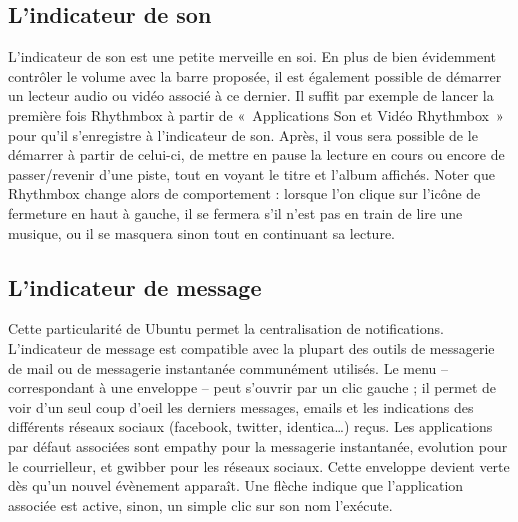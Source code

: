 \subsection{L'indicateur de son}
L'indicateur de son est une petite merveille en soi. En plus de bien évidemment contrôler le volume avec la barre proposée, il est également possible de démarrer un lecteur audio ou vidéo associé à ce dernier. Il suffit par exemple de lancer la première fois Rhythmbox à partir de «~Applications \FlecheDroite Son et Vidéo \FlecheDroite Rhythmbox~» pour qu'il s'enregistre à l'indicateur de son. Après, il vous sera possible de le démarrer à partir de celui-ci, de mettre en pause la lecture en cours ou encore de passer/revenir d'une piste, tout en voyant le titre et l'album affichés. Noter que Rhythmbox change alors de comportement : lorsque l'on clique sur l'icône de fermeture en haut à gauche, il se fermera s'il n'est pas en train de lire une musique, ou il se masquera sinon tout en continuant sa lecture.
\subsection{L'indicateur de message}
Cette particularité de Ubuntu permet la centralisation de notifications. L'indicateur de message est compatible avec la plupart des outils de messagerie de mail ou de messagerie instantanée communément utilisés. Le menu -- correspondant à une enveloppe -- peut s'ouvrir par un clic gauche ; il permet de voir d'un seul coup d'oeil les derniers messages, emails et les indications des différents réseaux sociaux (facebook, twitter, identica\dots{}) reçus. Les applications par défaut associées sont empathy pour la messagerie instantanée, evolution pour le courrielleur, et gwibber pour les réseaux sociaux. Cette enveloppe devient verte dès qu'un nouvel évènement apparaît. Une flèche indique que l'application associée est active, sinon, un simple clic sur son nom l'exécute.
